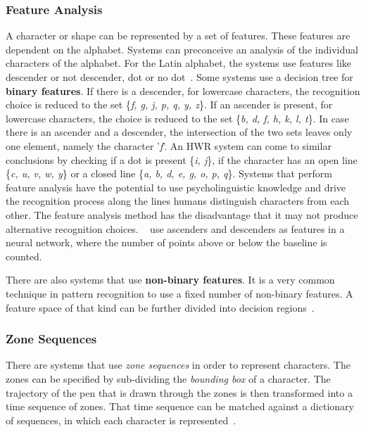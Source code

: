 \subsubsection{Feature Analysis}
\label{sec:featureanalysis}
A character or shape can be represented by a set of features. These features are
dependent on the alphabet. Systems can preconceive an analysis 
of the individual characters of the alphabet. For the Latin alphabet, the 
systems use features like descender or not descender, dot or no 
dot~. Some systems use a decision tree for 
\textbf{binary features}. 
If there is a descender, for lowercase characters, the recognition choice is 
reduced to the set \{\emph{f, g, j, p, q, y, z}\}. If an ascender is present, 
for lowercase characters, the choice is reduced to the 
set \{\emph{b, d, f, h, k, l, t}\}. In case there
is an ascender and a descender, the intersection of the two sets leaves only 
one element, namely the character '\emph{f}'. An HWR system can come to similar 
conclusions by checking if a dot is present \{\emph{i, j}\}, 
if the character has an open line \{\emph{c, u, v, w, y}\} or a closed 
line \{\emph{a, b, d, e, g, o, p, q}\}. 
Systems that perform feature analysis have the potential to use psycholinguistic 
knowledge and drive the recognition process along the lines humans distinguish 
characters from each other. The feature analysis method has the disadvantage that
it may not produce alternative recognition choices.
~\citeyear{Jaeger2001} use 
ascenders and descenders as features in a neural network, 
where the number of points above or below the baseline is counted.

There are also systems that use \textbf{non-binary features}. It is a very common
technique in pattern recognition to use a fixed number of non-binary features.
A feature space of that kind can be further divided into decision 
regions~.

\subsubsection{Zone Sequences}
\label{sec:zonesequences}

There are systems that use \emph{zone sequences} in order to 
represent characters. The zones can be specified by sub-dividing the
\emph{bounding box} of a character. The trajectory of the pen that is drawn 
through the zones is then transformed into a time sequence of zones. 
That time sequence can be matched against a dictionary of sequences, 
in which each character is represented~.

